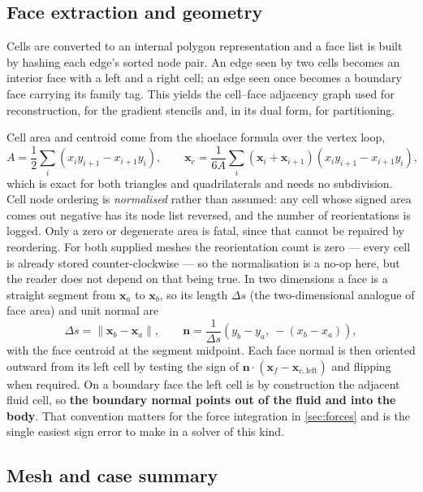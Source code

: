 \subsection{Face extraction and geometry}

Cells are converted to an internal polygon representation and a face list is
built by hashing each edge's sorted node pair. An edge seen by two cells becomes
an interior face with a left and a right cell; an edge seen once becomes a
boundary face carrying its family tag. This yields the cell--face adjacency
graph used for reconstruction, for the gradient stencils and, in its dual form,
for partitioning.

Cell area and centroid come from the shoelace formula over the vertex loop,
\begin{equation}
  A=\frac12\sum_i \left(x_i y_{i+1}-x_{i+1}y_i\right),\qquad
  \mathbf{x}_c=\frac{1}{6A}\sum_i (\mathbf{x}_i+\mathbf{x}_{i+1})
  \left(x_i y_{i+1}-x_{i+1}y_i\right),
  \label{eq:shoelace}
\end{equation}
which is exact for both triangles and quadrilaterals and needs no subdivision.
Cell node ordering is \emph{normalised} rather than assumed: any cell whose signed
area comes out negative has its node list reversed, and the number of reorientations
is logged. Only a zero or degenerate area is fatal, since that cannot be repaired by
reordering. For both supplied meshes the reorientation count is zero --- every cell
is already stored counter-clockwise --- so the normalisation is a no-op here, but the
reader does not depend on that being true. In two dimensions a
face is a straight segment from $\mathbf{x}_a$ to $\mathbf{x}_b$, so its length
$\Delta s$ (the two-dimensional analogue of face area) and unit normal are
\begin{equation}
  \Delta s=\|\mathbf{x}_b-\mathbf{x}_a\|,\qquad
  \mathbf{n}=\frac{1}{\Delta s}\left(y_b-y_a,\ -(x_b-x_a)\right),
\end{equation}
with the face centroid at the segment midpoint. Each face normal is then
oriented outward from its left cell by testing the sign of
$\mathbf{n}\cdot(\mathbf{x}_f-\mathbf{x}_{c,\mathrm{left}})$ and flipping when
required. On a boundary face the left cell is by construction the adjacent fluid
cell, so \textbf{the boundary normal points out of the fluid and into the body}.
That convention matters for the force integration in \cref{sec:forces} and is
the single easiest sign error to make in a solver of this kind.

\subsection{Mesh and case summary}

